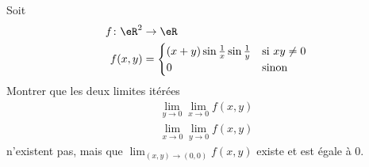 \begin{exercice}[\minsyndical]\label{exoLimiteContinue0004}

Soit 
\begin{equation}
	\begin{aligned}
		f\colon \eR^2&\to \eR \\
		f(x,y)&=
		\begin{cases}
			(x+y)\sin\frac{1}{ x }\sin\frac{1}{ y }	&	\text{si $xy\neq 0$}\\
			0	&	 \text{sinon}
		\end{cases}
	\end{aligned}
\end{equation}
Montrer que  les deux limites itérées 
\begin{subequations}
	\begin{align}
		\lim_{y\to 0}\lim_{x\to 0}f(x,y)\\
		\lim_{x\to 0}\lim_{y\to 0}f(x,y) 
	\end{align}
\end{subequations}
n'existent pas, mais que
$\lim_{(x,y)\to (0,0)}f(x,y)$ 
existe et est égale à $0$.

\end{exercice}
